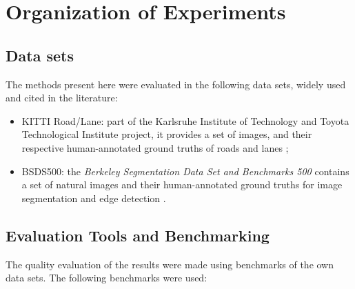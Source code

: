 \section{Organization of Experiments}

\subsection{Data sets}
\label{cap5_bases_dados}

The methods present here were evaluated in the following data sets, widely used and cited in the literature:

\begin{itemize}
 \item KITTI Road/Lane: part of the Karlsruhe Institute of Technology and Toyota Technological Institute project, it provides a set of images, and their respective human-annotated ground truths of roads and lanes \cite{Fritsch2013ITSC}; %

 \item BSDS500: the \textit{Berkeley Segmentation Data Set and Benchmarks 500} contains a set of natural images and their human-annotated ground truths for image segmentation and edge detection \cite{amfm_pami2011}. %
 
\end{itemize}

\subsection{Evaluation Tools and Benchmarking}
\label{cap5_formas_avaliacao}

The quality evaluation of the results were made using benchmarks of the own data sets. %
The following benchmarks were used:

